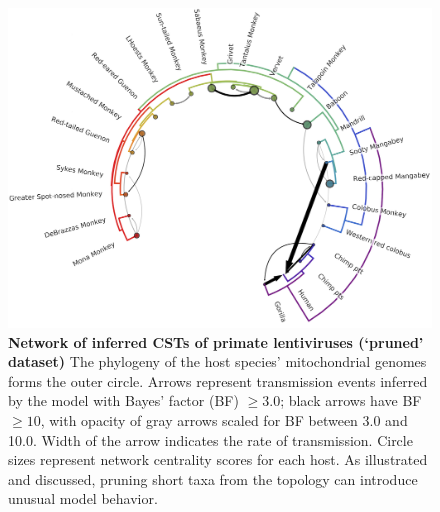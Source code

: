 \begin{figure}[h!]
  \begin{centering}
    \includegraphics[width=.8\linewidth]{./png/siv_pruneddata_cst.png}
  	\caption[Network of inferred CSTs of primate lentiviruses (`pruned' dataset)]{\textbf{Network of inferred CSTs of primate lentiviruses (`pruned' dataset) }
    The phylogeny of the host species' mitochondrial genomes forms the outer circle.
    Arrows represent transmission events inferred by the model with Bayes' factor (BF) $\geq 3.0$; black arrows have BF $\geq 10$, with opacity of gray arrows scaled for BF between 3.0 and 10.0.
    Width of the arrow indicates the rate of transmission.
    Circle sizes represent network centrality scores for each host.
    As illustrated and discussed, pruning short taxa from the topology can introduce unusual model behavior.
}
  	\label{siv_pruneddata_cst}
  \end{centering}
\end{figure}

